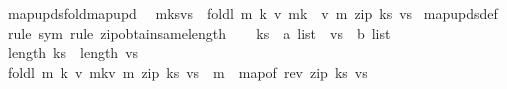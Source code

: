 \begin{isabellebody}
\endisatagproof
{\isafoldproof}%
%
\isadelimproof
\isanewline
%
\endisadelimproof
\isanewline
{}\isamarkupfalse%
\ map{\isacharunderscore}{\kern0pt}upds{\isacharunderscore}{\kern0pt}fold{\isacharunderscore}{\kern0pt}map{\isacharunderscore}{\kern0pt}upd{\isacharcolon}{\kern0pt}\isanewline
\ \ {\isachardoublequoteopen}m{\isacharparenleft}{\kern0pt}ks{\isacharbrackleft}{\kern0pt}{\isasymmapsto}{\isacharbrackright}{\kern0pt}vs{\isacharparenright}{\kern0pt}\ {\isacharequal}{\kern0pt}\ foldl\ {\isacharparenleft}{\kern0pt}{\isasymlambda}m\ {\isacharparenleft}{\kern0pt}k{\isacharcomma}{\kern0pt}\ v{\isacharparenright}{\kern0pt}{\isachardot}{\kern0pt}\ m{\isacharparenleft}{\kern0pt}k\ {\isasymmapsto}\ v{\isacharparenright}{\kern0pt}{\isacharparenright}{\kern0pt}\ m\ {\isacharparenleft}{\kern0pt}zip\ ks\ vs{\isacharparenright}{\kern0pt}{\isachardoublequoteclose}\isanewline
%
\isadelimproof
%
\endisadelimproof
%
\isatagproof
{}\isamarkupfalse%
\ map{\isacharunderscore}{\kern0pt}upds{\isacharunderscore}{\kern0pt}def\ \isamarkupfalse%
\ {\isacharparenleft}{\kern0pt}rule\ sym{\isacharcomma}{\kern0pt}\ rule\ zip{\isacharunderscore}{\kern0pt}obtain{\isacharunderscore}{\kern0pt}same{\isacharunderscore}{\kern0pt}length{\isacharparenright}{\kern0pt}\isanewline
\ \ \isamarkupfalse%
\ ks\ {\isacharcolon}{\kern0pt}{\isacharcolon}{\kern0pt}\ {\isachardoublequoteopen}{\isacharprime}{\kern0pt}a\ list{\isachardoublequoteclose}\ \ vs\ {\isacharcolon}{\kern0pt}{\isacharcolon}{\kern0pt}\ {\isachardoublequoteopen}{\isacharprime}{\kern0pt}b\ list{\isachardoublequoteclose}\isanewline
\ \ \isamarkupfalse%
\ {\isachardoublequoteopen}length\ ks\ {\isacharequal}{\kern0pt}\ length\ vs{\isachardoublequoteclose}\isanewline
\ \ \isamarkupfalse%
\ \isamarkupfalse%
\ {\isachardoublequoteopen}foldl\ {\isacharparenleft}{\kern0pt}{\isasymlambda}m\ {\isacharparenleft}{\kern0pt}k{\isacharcomma}{\kern0pt}\ v{\isacharparenright}{\kern0pt}{\isachardot}{\kern0pt}\ m{\isacharparenleft}{\kern0pt}k{\isasymmapsto}v{\isacharparenright}{\kern0pt}{\isacharparenright}{\kern0pt}\ m\ {\isacharparenleft}{\kern0pt}zip\ ks\ vs{\isacharparenright}{\kern0pt}\ {\isacharequal}{\kern0pt}\ m\ {\isacharplus}{\kern0pt}{\isacharplus}{\kern0pt}\ map{\isacharunderscore}{\kern0pt}of\ {\isacharparenleft}{\kern0pt}rev\ {\isacharparenleft}{\kern0pt}zip\ ks\ vs{\isacharparenright}{\kern0pt}{\isacharparenright}{\kern0pt}{\isachardoublequoteclose}\isanewline
\ \ \ \ \isamarkupfalse%

\end{isabellebody}
